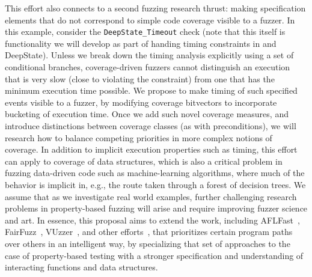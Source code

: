 This effort also connects to a second fuzzing research thrust: making specification elements that do not correspond to simple code coverage visible to a fuzzer.  In this example, consider the {\tt DeepState\_Timeout} check (note that this itself is functionality we will develop as part of handing timing constraints in \framac and DeepState).  Unless we break down the timing analysis explicitly using a set of conditional branches, coverage-driven fuzzers cannot distinguish an execution that is very slow (close to violating the constraint) from one that has the minimum execution time possible.  We propose to make timing of such specified events visible to a fuzzer, by modifying coverage bitvectors to incorporate bucketing of execution time.  Once we add such novel coverage measures, and introduce distinctions between coverage classes (as with preconditions), we will research how to balance competing priorities in more complex notions of coverage.  In addition to implicit execution properties such as timing, this effort can apply to coverage of data structures, which is also a critical problem in fuzzing data-driven code such as machine-learning algorithms, where much of the behavior is implicit in, e.g., the route taken through a forest of decision trees.  We assume that as we investigate real world examples, further challenging research problems in property-based fuzzing will arise and require improving fuzzer science and art.  In essence, this proposal aims to extend the work, including AFLFast~\cite{aflfast}, FairFuzz~\cite{lemieux2018fairfuzz}, VUzzer~\cite{vuzzer}, and other efforts~\cite{zhao2019send,aschermann2019redqueen}, that prioritizes certain program paths over others in an intelligent way, by specializing that set of approaches to the case of property-based testing with a stronger specification and understanding of interacting functions and data structures.

